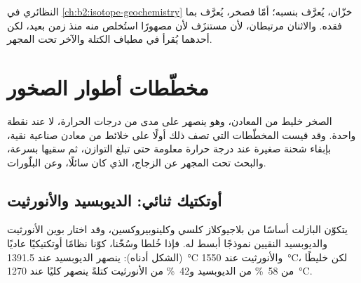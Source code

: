  النظائري في \cref{ch:b2:isotope-geochemistry} خزّان،
يُعرَّف بنسبه؛ أمّا  فصخر، يُعرَّف بما فقده.
والاثنان مرتبطان، لأن  مستنزَف لأن مصهورًا
استُخلص منه منذ زمن بعيد، لكن أحدهما يُقرأ في مطياف الكتلة والآخر
تحت المجهر.

\section{مخطّطات أطوار الصخور}\label{sec:b2:mantle-melting:diagrams}

الصخر خليط من المعادن، وهو ينصهر على مدى من درجات الحرارة، لا عند
نقطة واحدة. وقد قيست المخطّطات التي تصف ذلك أولًا على خلائط من
معادن صناعية نقية، بإبقاء شحنة صغيرة عند درجة حرارة معلومة حتى
تبلغ التوازن، ثم سقيها بسرعة، والبحث تحت المجهر عن الزجاج،
الذي كان سائلًا، وعن البلّورات.

\subsection*{أوتكتيك ثنائي: الديوبسيد والأنورثيت}

يتكوّن البازلت أساسًا من بلاجيوكلاز كلسي وكلينوبيروكسين،
وقد اختار بوين الأنورثيت والديوبسيد النقيين نموذجًا أبسط له. فإذا خُلطا وسُخّنا،
كوّنا نظامًا أوتكتيكيًا
عاديًا (الشكل أدناه): ينصهر الديوبسيد عند \qty{1391.5}{\celsius} والأنورثيت
عند \qty{1550}{\celsius}، لكن خليطًا من \qty{58}{\percent} من الديوبسيد
و\qty{42}{\percent} من الأنورثيت كتلةً ينصهر كليًا عند \qty{1270}{\celsius}.

